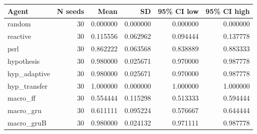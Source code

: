 \begin{tabular}{lrrrrr}
\toprule
Agent & N seeds & Mean & SD & 95\% CI low & 95\% CI high \\
\midrule
random & 30 & 0.000000 & 0.000000 & 0.000000 & 0.000000 \\
reactive & 30 & 0.115556 & 0.062962 & 0.094444 & 0.137778 \\
psrl & 30 & 0.862222 & 0.063568 & 0.838889 & 0.883333 \\
hypothesis & 30 & 0.980000 & 0.025671 & 0.970000 & 0.987778 \\
hyp\_adaptive & 30 & 0.980000 & 0.025671 & 0.970000 & 0.987778 \\
hyp\_transfer & 30 & 1.000000 & 0.000000 & 1.000000 & 1.000000 \\
macro\_ff & 30 & 0.554444 & 0.115298 & 0.513333 & 0.594444 \\
macro\_gru & 30 & 0.611111 & 0.095224 & 0.576667 & 0.644444 \\
macro\_gruB & 30 & 0.980000 & 0.024132 & 0.971111 & 0.987778 \\
\bottomrule
\end{tabular}
